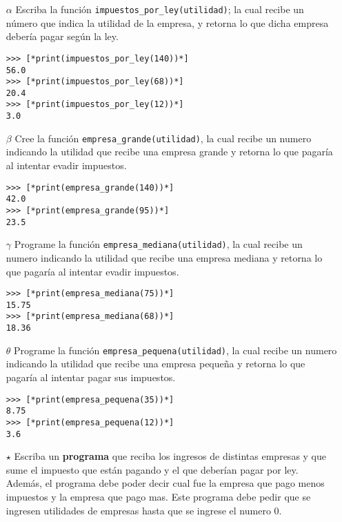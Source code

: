 \begin{enumerate}
    \item[$\alpha$] Escriba la función \texttt{impuestos\_por\_ley(utilidad)}; la cual recibe un número que indica la utilidad de la empresa, y retorna lo que dicha empresa debería pagar según la ley.
    
    \begin{lstlisting}[style=consola]    
>>> [*print(impuestos_por_ley(140))*]
56.0
>>> [*print(impuestos_por_ley(68))*]
20.4
>>> [*print(impuestos_por_ley(12))*]
3.0
    \end{lstlisting}
    
    \item[$\beta$] Cree la función \texttt{empresa\_grande(utilidad)}, la cual recibe un numero indicando la utilidad que recibe una empresa grande y retorna lo que pagaría al intentar evadir impuestos.
    
    \begin{lstlisting}[style=consola]
>>> [*print(empresa_grande(140))*]
42.0
>>> [*print(empresa_grande(95))*]
23.5
    \end{lstlisting}
    
    \item[$\gamma$] Programe la función \texttt{empresa\_mediana(utilidad)}, la cual recibe un numero indicando la utilidad que recibe una empresa mediana y retorna lo que pagaría al intentar evadir impuestos.
    
    \begin{lstlisting}[style=consola]
>>> [*print(empresa_mediana(75))*]
15.75
>>> [*print(empresa_mediana(68))*]
18.36
    \end{lstlisting}
    \newpage
    \item[$\theta$] Programe la función \texttt{empresa\_pequena(utilidad)}, la cual recibe un numero indicando la utilidad que recibe una empresa pequeña y retorna lo que pagaría al intentar pagar sus impuestos.
    \begin{lstlisting}[style=consola]
>>> [*print(empresa_pequena(35))*]
8.75
>>> [*print(empresa_pequena(12))*]
3.6
    \end{lstlisting}
    
    \item[$\star$] Escriba un \textbf{programa} que reciba los ingresos de distintas empresas y que sume el impuesto que están pagando y el que deberían pagar por ley. Además, el programa debe poder decir cual fue la empresa que pago menos impuestos y la empresa que pago mas. Este programa debe pedir que se ingresen utilidades de empresas hasta que se ingrese el numero 0.
    

\end{enumerate}
